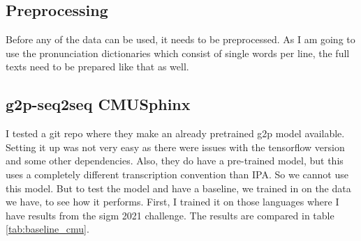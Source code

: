 \subsection{Preprocessing}
Before any of the data can be used, it needs to be preprocessed. As I am going to use the pronunciation dictionaries which consist of single words per line, the full texts need to be prepared like that as well.

\subsection{g2p-seq2seq CMUSphinx}
I tested a git repo where they make an already pretrained \ac{g2p} model available. Setting it up was not very easy as there were issues with the tensorflow version and some other dependencies. Also, they do have a pre-trained model, but this uses a completely different transcription convention than IPA. So we cannot use this model. But to test the model and have a baseline, we trained in on the data we have, to see how it performs. First, I trained it on those languages where I have results from the \ac{sigm} 2021 challenge. The results are compared in table \ref{tab:baseline_cmu}. 




